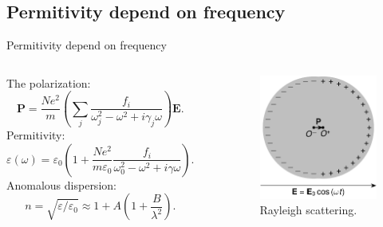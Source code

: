 \subsection{Permitivity depend on frequency}

\begin{frame}{Permitivity depend on frequency}
    \begin{columns}
        The polarization:
        \begin{equation*}
            \mathbf{P} = \dfrac{Ne^2}{m} \left( \sum_j \dfrac{f_i}{\omega_j^2 - \omega^2 + i \gamma_j \omega} \right) \mathbf{E}.
        \end{equation*}
        Permitivity:
        \begin{equation*}
            \varepsilon (\omega) = \varepsilon_0\left( 1 + \dfrac{Ne^2}{m \varepsilon_0} \dfrac{f_i}{\omega_0^2 - \omega^2 + i \gamma \omega} \right).
        \end{equation*}
        Anomalous dispersion:
        \begin{equation*}
            n = \sqrt{\varepsilon/\varepsilon_0} \approx 1 + A \left( 1 + \dfrac{B}{\lambda^2} \right).
        \end{equation*}

        \cite{Landau_1984}
        
        \vspace{-3mm}
        \begin{figure}
            \centering
            \includegraphics[width=\textwidth]{Figures/Rayleigh_scattering.pdf}
            \caption{Rayleigh scattering.}
            \label{fig:Rayleigh_scattering}
        \end{figure}
    \end{columns}
\end{frame}